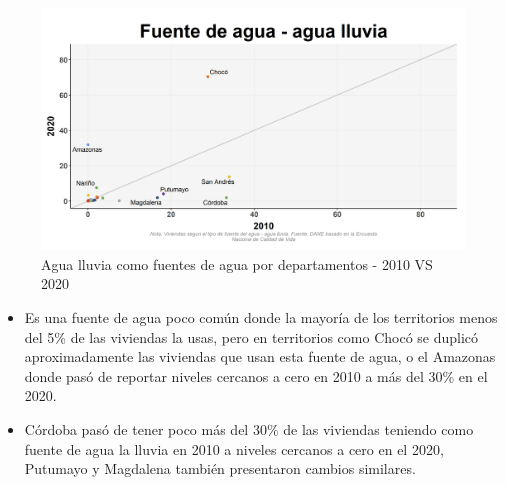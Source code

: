     \begin{figure}[H]
        \caption{Agua lluvia como fuentes de agua por departamentos - 2010 VS 2020 \label{map_result_2} }
        \begin{center}
        \includegraphics[width=\textwidth,keepaspectratio]{img/var_139_scatter_time.png}
        \end{center}
    \end{figure}
            \begin{itemize}
                    \item Es una fuente de agua poco común donde la mayoría de los territorios menos del 5\% de las viviendas la usas, pero en territorios como Chocó se duplicó aproximadamente las viviendas que usan esta fuente de agua, o el Amazonas donde pasó de reportar niveles cercanos a cero en 2010 a más del 30\% en el 2020.
                    \item Córdoba pasó de tener poco más del 30\% de las viviendas teniendo como fuente de agua la lluvia en 2010 a niveles cercanos a cero en el 2020, Putumayo y Magdalena también presentaron cambios similares.
                    \end{itemize}

